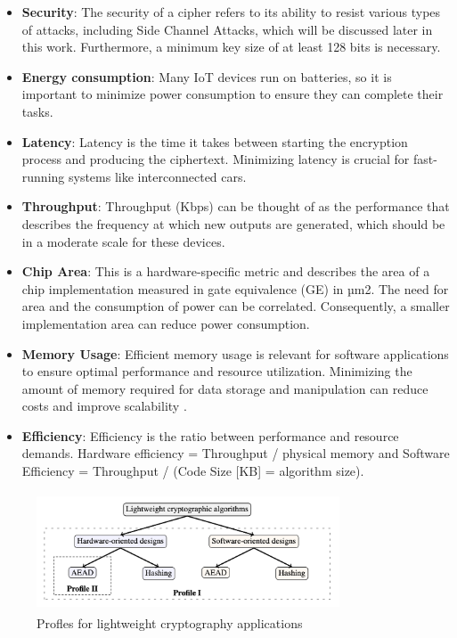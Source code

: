 \documentclass[a4paper,11pt, twoside]{article}
\begin{document}
\begin{itemize}
    \setlength{\itemsep}{-5pt}
    \item \textbf{Security}: The security of a cipher refers to its ability to resist various types of attacks, including Side Channel Attacks, which will be discussed later in this work. Furthermore, a minimum key size of at least 128 bits is necessary.
    \item \textbf{Energy consumption}: Many IoT devices run on batteries, so it is important to minimize power consumption to ensure they can complete their tasks.
    \item \textbf{Latency}: Latency is the time it takes between starting the encryption process and producing the ciphertext. Minimizing latency is crucial for fast-running systems like interconnected cars.
    \item \textbf{Throughput}: Throughput (Kbps) can be thought of as the performance that describes the frequency at which new outputs are generated, which should be in a moderate scale for these devices.
    \item \textbf{Chip Area}: This is a hardware-specific metric and describes the area of a chip implementation measured in gate equivalence (GE) in µm2. The need for area and the consumption of power can be correlated. Consequently, a smaller implementation area can reduce power consumption.
    \item \textbf{Memory Usage}: Efficient memory usage is relevant for software applications to ensure optimal performance and resource utilization. Minimizing the amount of memory required for data storage and manipulation can reduce costs and improve scalability \cite{mckay2016report}.
    \item \textbf{Efficiency}: Efficiency is the ratio between performance and resource demands. Hardware efficiency = Throughput / physical memory and Software Efficiency = Throughput / (Code Size [KB] = algorithm size).
\end{itemize}

\begin{figure}[h]
    \centering
    \includegraphics[width=9.0cm, height=3.5cm]{media/profiles.png}
    \caption{Profles for lightweight cryptography applications}
    \label{fig:profiles}
\end{figure}
\end{document}
